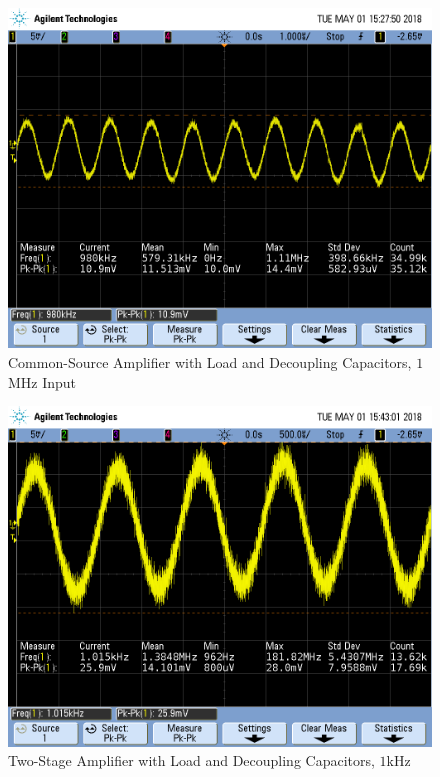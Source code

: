 \FloatBarrier

\begin{figure}[h!]
	\centering
	\includegraphics[scale=0.45]{./images/SCOPE_15.PNG}
	\caption{Common-Source Amplifier with Load and Decoupling Capacitors, $1$\si{\mega\hertz} Input}
	\label{fig:SCOPE_15}
\end{figure}

\FloatBarrier

\begin{figure}[h!]
	\centering
	\includegraphics[scale=0.45]{./images/SCOPE_18.PNG}
	\caption{Two-Stage Amplifier with Load and Decoupling Capacitors, $1$\si{\kilo\hertz}}
	\label{fig:SCOPE_18}
\end{figure}

